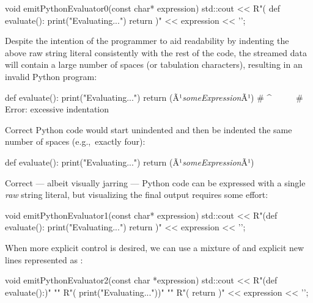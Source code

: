\begin{emcppslisting}[language=C++]
void emitPythonEvaluator0(const char* expression)
{
    std::cout << R"(
        def evaluate():
            print("Evaluating...")
            return )" << expression << '\n';
}
\end{emcppslisting}
    
\noindent Despite the intention of the programmer to aid readability by indenting
the above raw string literal consistently with the rest of the code, the
streamed data will contain a large number of spaces (or tabulation
characters), resulting in an invalid Python program:

\begin{emcppslisting}[language=C++]
        def evaluate():
            print("Evaluating...")
            return (Ã¹{\emph{someExpression}}Ã¹)
# ^~~~~~
# Error: excessive indentation
\end{emcppslisting}
    
\noindent Correct Python code would start unindented and then be indented the same number
of spaces (e.g.,~exactly four):

\begin{emcppslisting}[language=C++]
def evaluate():
    print("Evaluating...")
    return (Ã¹{\emph{someExpression}}Ã¹)
\end{emcppslisting}
    
\noindent Correct --- albeit visually jarring --- Python code can be expressed with a
single \emph{raw} string literal, but visualizing the final output requires some effort:

\begin{emcppslisting}[language=C++]
void emitPythonEvaluator1(const char* expression)
{
    std::cout << R"(def evaluate():
    print("Evaluating...")
    return )" << expression << '\n';
}
\end{emcppslisting}
    
\noindent When more explicit control is desired, we can use a mixture of
 and explicit new lines represented as
:

\begin{emcppslisting}[language=C++]
void emitPythonEvaluator2(const char *expression)
{
    std::cout <<
        R"(def evaluate():)"                 "\n"
        R"(    print("Evaluating..."))"      "\n"
        R"(    return )" << expression << '\n';
}
\end{emcppslisting}
    

